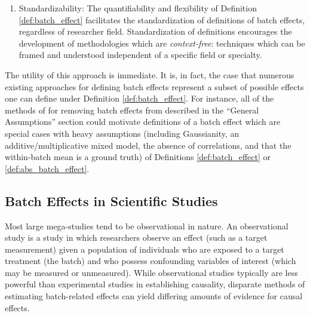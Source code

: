 \begin{enumerate}
    \item Standardizability: The quantifiability and flexibility of Definition \ref{def:batch_effect} facilitates the standardization of definitions of batch effects, regardless of researcher field. Standardization of definitions encourages the development of methodologies which are \textit{context-free}: techniques which can be framed and understood independent of a specific field or specialty. 
\end{enumerate}
The utility of this approach is immediate. It is, in fact, the case that numerous existing approaches for defining batch effects represent a subset of possible effects one can define under Definition \ref{def:batch_effect}. For instance, all of the methods of for removing batch effects from \citet{Lazar2013Jul} described in the ``General Assumptions'' section could motivate definitions of a batch effect which are special cases with heavy assumptions (including Gaussianity, an additive/multiplicative mixed model, the absence of correlations, and that the within-batch mean is a ground truth) of Definitions \ref{def:batch_effect} or \ref{def:abs_batch_effect}.

\subsection{Batch Effects in Scientific Studies}
\label{sec:batch_study}
Most large mega-studies tend to be observational in nature. An observational study is a study in which researchers observe an effect (such as a target measurement) given a population of individuals who are exposed to a target treatment (the batch) and who possess confounding variables of interest (which may be measured or unmeasured). While observational studies typically are less powerful than experimental studies in establishing causality, disparate methods of estimating batch-related effects can yield differing amounts of evidence for causal effects.

